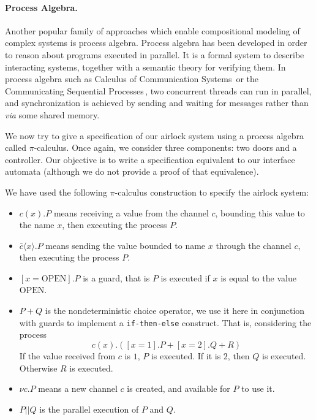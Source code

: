 \paragraph{Process Algebra.}
%
Another popular family of approaches which enable compositional modeling of
complex systems is process algebra.
%
Process algebra has been developed in order to reason about programs executed
in parallel.
%
It is a formal system to describe interacting systems, together with a semantic
theory for verifying them.
%
In process algebra such as Calculus of Communication
Systems\,\cite{milner1980ccs} or the Communicating Sequential
Processes\,\cite{hoare1978csp}, two concurrent threads can run in parallel, and
synchronization is achieved by sending and waiting for messages rather than
\emph{via} some shared memory.

\begin{example}
  We now try to give a specification of our airlock system using a process
  algebra called \( \pi \)-calculus.
  Once again, we consider three components: two doors and a controller.
  Our objective is to write a specification equivalent to our interface automata
  (although we do not provide a proof of that equivalence).

  We have used the following \( \pi \)-calculus construction to specify the
  airlock system:
  \begin{itemize}
  \item \( c(x). P\) means receiving a value from the channel \( c \), bounding
    this value to the name \( x \), then executing the process \( P \).
  \item \( \bar{c} \langle x \rangle . P \) means sending the value bounded to
    name \( x \) through the channel \( c \), then executing the process
    \( P \).
  \item \( [x = \mathrm{OPEN}] . P \) is a guard, that is \( P \) is executed if
    \( x \) is equal to the value \( \mathrm{OPEN} \).
  \item \( P + Q \) is the nondeterministic choice operator, we use it here in
    conjunction with guards to implement a \texttt{if-then-else} construct. That
    is, considering the process
    \[
      c(x) . ([x = 1] . P + [x = 2] . Q + R)
    \]
    If the value received from \( c \) is \( 1 \), \( P \) is executed.
    If it is \( 2 \), then \( Q \) is executed. Otherwise \( R \) is executed.
  \item \( \nu c. P \) means a new channel \( c \) is created, and available for
    \( P \) to use it.
  \item \( P || Q \) is the parallel execution of \( P \) and \( Q \).
  \end{itemize}


\end{example}
